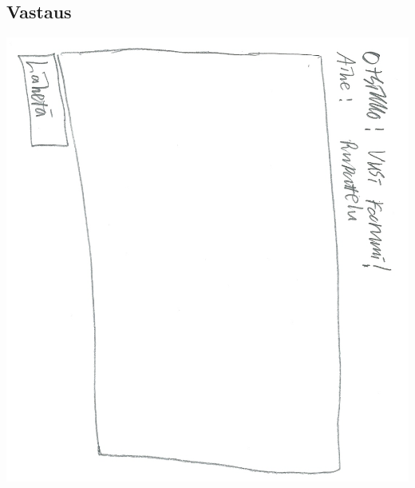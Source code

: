 \documentclass[a4paper, 12pt, finnish]{article}
\begin{document}
\subsection{Vastaus}
\includegraphics[width=\textwidth,height=\textheight,keepaspectratio]{vastaus.png}
\end{document}
